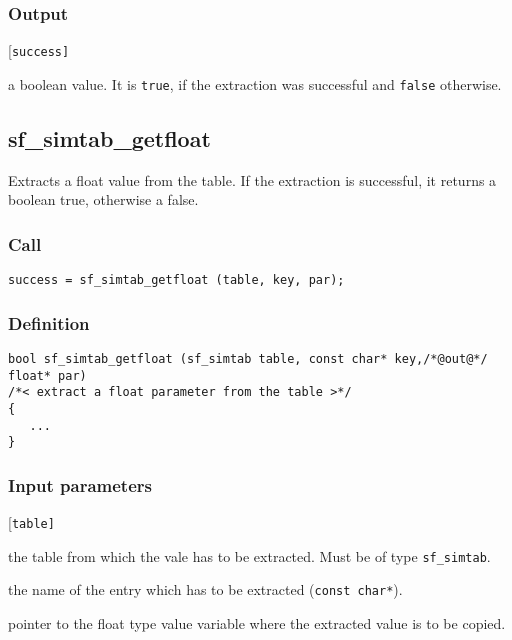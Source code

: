 \subsubsection*{Output}
\begin{desclist}{\tt }{\quad}[\tt success]
   \setlength\itemsep{0pt}
   \item[success] a boolean value. It is \texttt{true}, if the extraction was successful and \texttt{false} otherwise.
\end{desclist}




\subsection{{sf\_simtab\_getfloat}}\label{sec:sf_simtab_getfloat}
Extracts a float value from the table. If the extraction is successful, it returns a boolean true, otherwise a false. 

\subsubsection*{Call}
\begin{verbatim}success = sf_simtab_getfloat (table, key, par);\end{verbatim}

\subsubsection*{Definition}
\begin{verbatim}
bool sf_simtab_getfloat (sf_simtab table, const char* key,/*@out@*/ float* par)
/*< extract a float parameter from the table >*/
{
   ...
}
\end{verbatim}

\subsubsection*{Input parameters}
\begin{desclist}{\tt }{\quad}[\tt table]
   \setlength\itemsep{0pt}
   \item[table] the table from which the vale has to be extracted. Must be of type \texttt{sf\_simtab}.
   \item[key]   the name of the entry which has to be extracted (\texttt{const char*}).
   \item[par]   pointer to the float type value variable where the extracted value is to be copied.
\end{desclist}

